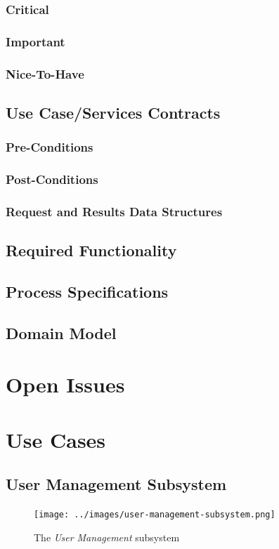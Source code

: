 \documentclass{article}
\begin{document}
		\subsubsection{Critical}
		\subsubsection{Important}
		\subsubsection{Nice-To-Have}
	\subsection{Use Case/Services Contracts}
		\subsubsection{Pre-Conditions}
		\subsubsection{Post-Conditions}
		\subsubsection{Request and Results Data Structures}
	\subsection{Required Functionality}
	\subsection{Process Specifications}
	\subsection{Domain Model}

\section{Open Issues}

\section{Use Cases}
	\subsection{User Management Subsystem}
		\begin{figure}[H]
			\centering
			\texttt{[image: ../images/user-management-subsystem.png]}
			\caption{The \emph{User Management} subsystem}
		\end{figure}
\end{document}
